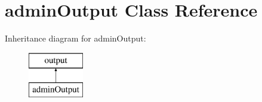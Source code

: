 \hypertarget{classadmin_output}{\section{admin\-Output Class Reference}
\label{classadmin_output}
}
Inheritance diagram for admin\-Output\-:\begin{figure}[H]
\begin{center}
\leavevmode
\includegraphics[height=2.000000cm]{classadmin_output}
\end{center}
\end{figure}
